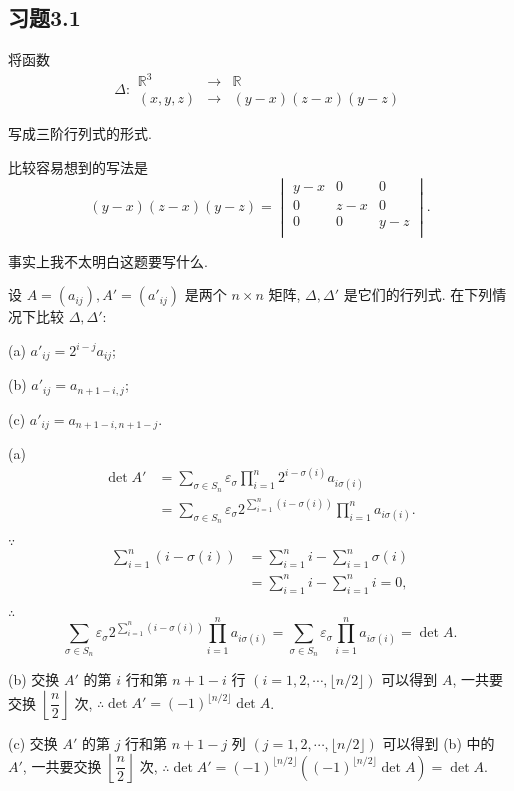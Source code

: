 \documentclass{ctexart}
\begin{document}
\subsection{习题3.1}
\begin{exercise}[1.1]
    将函数
    \[\Delta:\begin{array}{rcl}
        \mathbb{R}^3 & \to & \mathbb{R} \\
        (x,y,z) & \to & (y-x)(z-x)(y-z)
    \end{array}\]

    写成三阶行列式的形式.
\end{exercise}
\begin{solution}
    比较容易想到的写法是
    \[(y-x)(z-x)(y-z)=\begin{vmatrix}
        y-x & 0 & 0 \\
        0 & z-x & 0 \\
        0 & 0 & y-z \\
    \end{vmatrix}.\]
\end{solution}
\begin{note}
    事实上我不太明白这题要写什么.
\end{note}
\begin{exercise}[1.2]
    设 $A=(a_{ij}),A'=(a'_{ij})$ 是两个 $n\times n$ 矩阵, $\Delta,\Delta'$ 是它们的行列式. 在下列情况下比较 $\Delta,\Delta'$:

    (a) $a'_{ij}=2^{i-j}a_{ij}$;

    (b) $a'_{ij}=a_{n+1-i,j}$;

    (c) $a'_{ij}=a_{n+1-i,n+1-j}$.
\end{exercise}
\begin{solution}
    (a)
    \begin{align*}
        \det A' & =\sum\limits_{\sigma\in S_n}\varepsilon_\sigma\prod\limits_{i=1}^n2^{i-\sigma(i)}a_{i\sigma(i)} \\
        & =\sum\limits_{\sigma\in S_n}\varepsilon_\sigma2^{\sum\limits_{i=1}^n (i-\sigma(i))}\prod\limits_{i=1}^na_{i\sigma(i)}.
    \end{align*}

    $\because$
    \begin{align*}
        \sum\limits_{i=1}^n (i-\sigma(i)) & =\sum\limits_{i=1}^ni-\sum\limits_{i=1}^n\sigma(i) \\
        & =\sum\limits_{i=1}^ni-\sum\limits_{i=1}^ni=0,
    \end{align*}

    $\therefore$
    \[\sum\limits_{\sigma\in S_n}\varepsilon_\sigma2^{\sum\limits_{i=1}^n(i-\sigma(i))}\prod\limits_{i=1}^na_{i\sigma(i)}=\sum\limits_{\sigma\in S_n}\varepsilon_\sigma\prod\limits_{i=1}^na_{i\sigma(i)}=\det A.\]

    (b) 交换 $A'$ 的第 $i$ 行和第 $n+1-i$ 行 $(i=1,2,\cdots,\lfloor n/2\rfloor)$ 可以得到 $A$, 一共要交换 $\left\lfloor\dfrac{n}{2}\right\rfloor$ 次, $\therefore\det A'=(-1)^{\lfloor n/2\rfloor}\det A$.

    (c) 交换 $A'$ 的第 $j$ 行和第 $n+1-j$ 列 $(j=1,2,\cdots,\lfloor n/2\rfloor)$ 可以得到 (b) 中的 $A'$, 一共要交换 $\left\lfloor\dfrac{n}{2}\right\rfloor$ 次, $\therefore\det A'=(-1)^{\lfloor n/2\rfloor}((-1)^{\lfloor n/2\rfloor}\det A)=\det A$.
\end{solution}
\end{document}
